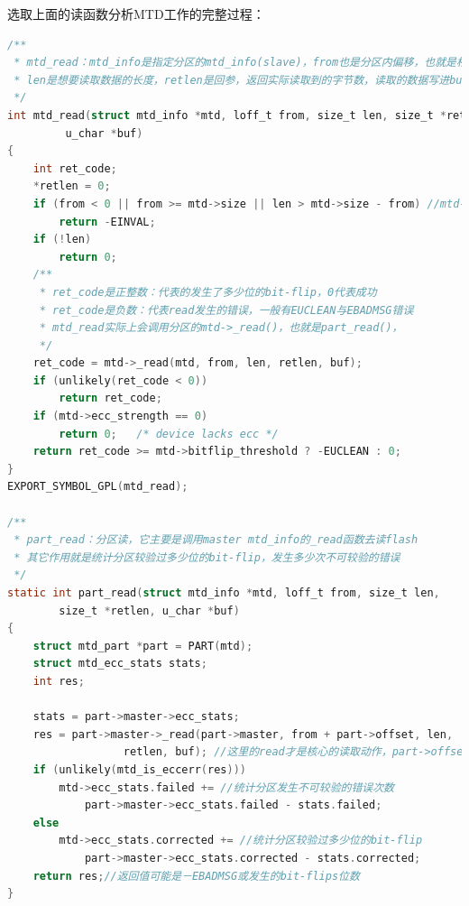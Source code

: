 选取上面的读函数分析MTD工作的完整过程：
\begin{lstlisting}[language=C]
/**
 * mtd_read：mtd_info是指定分区的mtd_info(slave)，from也是分区内偏移，也就是相对偏移
 * len是想要读取数据的长度，retlen是回参，返回实际读取到的字节数，读取的数据写进buf参数中
 */
int mtd_read(struct mtd_info *mtd, loff_t from, size_t len, size_t *retlen,
	     u_char *buf)
{
	int ret_code;
	*retlen = 0;
	if (from < 0 || from >= mtd->size || len > mtd->size - from) //mtd->size是分区大小
		return -EINVAL;
	if (!len)
		return 0;
	/**
	 * ret_code是正整数：代表的发生了多少位的bit-flip，0代表成功
	 * ret_code是负数：代表read发生的错误，一般有EUCLEAN与EBADMSG错误
	 * mtd_read实际上会调用分区的mtd->_read()，也就是part_read()，
	 */
	ret_code = mtd->_read(mtd, from, len, retlen, buf);
	if (unlikely(ret_code < 0))
		return ret_code;
	if (mtd->ecc_strength == 0)
		return 0;	/* device lacks ecc */
	return ret_code >= mtd->bitflip_threshold ? -EUCLEAN : 0;
}
EXPORT_SYMBOL_GPL(mtd_read);

/**
 * part_read：分区读，它主要是调用master mtd_info的_read函数去读flash
 * 其它作用就是统计分区较验过多少位的bit-flip，发生多少次不可较验的错误
 */
static int part_read(struct mtd_info *mtd, loff_t from, size_t len,
		size_t *retlen, u_char *buf)
{
	struct mtd_part *part = PART(mtd);
	struct mtd_ecc_stats stats;
	int res;

	stats = part->master->ecc_stats;
	res = part->master->_read(part->master, from + part->offset, len,
				  retlen, buf); //这里的read才是核心的读取动作，part->offset是分区偏移
	if (unlikely(mtd_is_eccerr(res)))
		mtd->ecc_stats.failed += //统计分区发生不可较验的错误次数
			part->master->ecc_stats.failed - stats.failed;
	else
		mtd->ecc_stats.corrected += //统计分区较验过多少位的bit-flip
			part->master->ecc_stats.corrected - stats.corrected;
	return res;//返回值可能是－EBADMSG或发生的bit-flips位数
}


\end{lstlisting}
